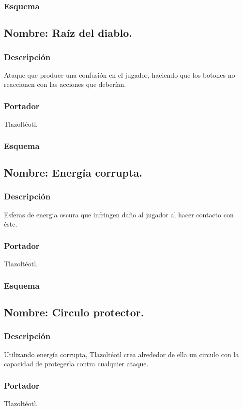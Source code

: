 \documentclass[11pt,letterpaper]{article}
\begin{document}
\subsubsection{Esquema}
\subsection{Nombre: Raíz del diablo.}
\subsubsection{Descripción}
Ataque que produce una confusión en el jugador, haciendo que los botones no reaccionen con las acciones que deberían.
\subsubsection{Portador}
Tlazoltéotl.
\subsubsection{Esquema}
\subsection{Nombre: Energía corrupta.}
\subsubsection{Descripción}
Esferas de energia oscura que infringen daño al jugador al hacer contacto con éste.
\subsubsection{Portador}
Tlazoltéotl.
\subsubsection{Esquema}
	
\subsection{Nombre: Circulo protector.}
\subsubsection{Descripción}
Utilizando energía corrupta,  Tlazoltéotl crea alrededor de ella un circulo con la capacidad de protegerla contra cualquier ataque.
\subsubsection{Portador}
Tlazoltéotl.
\end{document}
